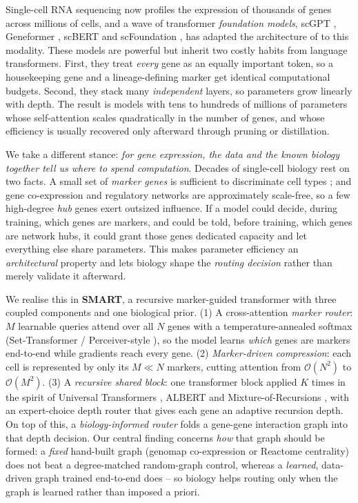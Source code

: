 \documentclass[letterpaper]{article}
\begin{document}
Single-cell RNA sequencing now profiles the expression of thousands of genes across
millions of cells, and a wave of transformer \emph{foundation models}, scGPT
\cite{cui2024scgpt}, Geneformer \cite{theodoris2023transfer}, scBERT
\cite{yang2022scbert} and scFoundation \cite{hao2024large}, has adapted the
architecture of \cite{vaswani2017attention} to this modality. These models are
powerful but inherit two costly habits from language transformers. First, they treat
\emph{every} gene as an equally important token, so a housekeeping gene and a
lineage-defining marker get identical computational budgets. Second, they stack many
\emph{independent} layers, so parameters grow linearly with depth. The result is
models with tens to hundreds of millions of parameters \cite{hao2024large} whose
self-attention scales quadratically in the number of genes, and whose efficiency is
usually recovered only afterward through pruning or distillation.

We take a different stance: \emph{for gene expression, the data and the known biology
together tell us where to spend computation}. Decades of single-cell biology rest on
two facts. A small set of \emph{marker genes} is sufficient to discriminate cell
types \cite{ianevski2022fully,franzen2019panglaodb,hu2023cellmarker}; and gene
co-expression and regulatory networks are approximately scale-free, so a few
high-degree \emph{hub} genes exert outsized influence. If a model could decide,
during training, which genes are markers, and could be told, before training, which
genes are network hubs, it could grant those genes dedicated capacity and let
everything else share parameters. This makes parameter efficiency an
\emph{architectural} property and lets biology shape the \emph{routing decision}
rather than merely validate it afterward.

We realise this in \textbf{SMART}, a recursive marker-guided transformer with three
coupled components and one biological prior. (1) A cross-attention \emph{marker
router}: $M$ learnable queries attend over all $N$ genes with a temperature-annealed
softmax (Set-Transformer / Perceiver-style \cite{jang2017categorical,balin2019concrete}),
so the model learns \emph{which} genes are markers end-to-end while gradients reach
every gene. (2) \emph{Marker-driven compression}: each cell is represented by only its
$M\ll N$ markers, cutting attention from $\mathcal{O}(N^2)$ to $\mathcal{O}(M^2)$.
(3) A \emph{recursive shared block}: one transformer block applied $K$ times in the
spirit of Universal Transformers \cite{dehghani2019universal}, ALBERT
\cite{lan2020albert} and Mixture-of-Recursions \cite{bae2025mixture}, with an
expert-choice depth router that gives each gene an adaptive recursion depth. On top
of this, a \emph{biology-informed router} folds a gene-gene interaction graph into that
depth decision. Our central finding concerns \emph{how} that graph should be formed: a
\emph{fixed} hand-built graph (genomap co-expression \cite{islam2023cartography} or
Reactome centrality) does not beat a degree-matched random-graph control, whereas a
\emph{learned}, data-driven graph trained end-to-end does -- so biology helps routing
only when the graph is learned rather than imposed a priori.
\end{document}

